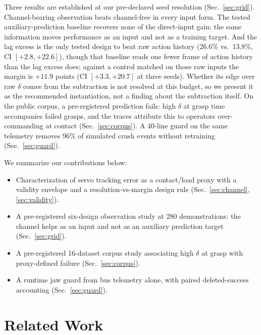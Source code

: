 \documentclass{article}
\begin{document}
Three results are established at our pre-declared seed resolution
(Sec.~\ref{sec:grid}). Channel-bearing observation beats channel-free in
every input form. The tested auxiliary-prediction baseline recovers none
of the direct-input gain: the same information moves performance as an
input and not as a training target. And the lag excess is the only tested
design to beat raw action history (26.6\% vs.\ 13.8\%, CI
$[+2.8, +22.6]$), though that baseline reads one fewer frame of action
history than the lag excess does; against a control matched on those raw
inputs the margin is $+11.9$ points (CI $[+3.3, +20.7]$ at three seeds).
Whether its edge over raw $\delta$ comes from the subtraction is not
resolved at this budget, so we present it as the recommended
instantiation, not a finding about the subtraction itself. On
the public corpus, a pre-registered prediction fails: high $\delta$ at
grasp time accompanies failed grasps, and the traces attribute this to
operators over-commanding at contact (Sec.~\ref{sec:corpus}). A 40-line guard on the same telemetry removes
96\% of simulated crush events without retraining (Sec.~\ref{sec:guard}).

We summarize our contributions below:
\begin{itemize}
  \item Characterization of servo tracking error as a contact/load proxy
  with a validity envelope and a resolution-vs-margin design rule
  (Sec.~\ref{sec:channel}, \ref{sec:validity}).
  \item A pre-registered six-design observation study at 280
  demonstrations: the channel helps as an input and not as an auxiliary
  prediction target (Sec.~\ref{sec:grid}).
  \item A pre-registered 16-dataset corpus study associating high
  $\delta$ at grasp with proxy-defined failure (Sec.~\ref{sec:corpus}).
  \item A runtime jaw guard from bus telemetry alone, with paired
  deleted-success accounting (Sec.~\ref{sec:guard}).
\end{itemize}


\section{Related Work}
\label{sec:related}
\end{document}
